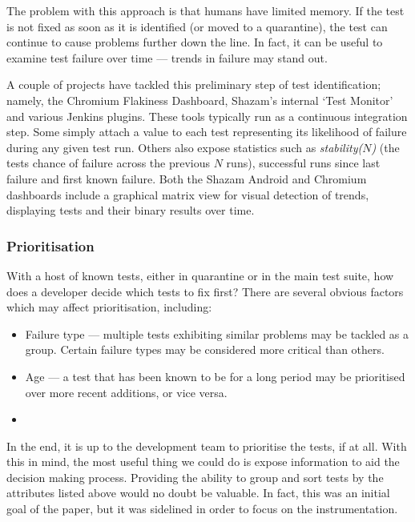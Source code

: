 The problem with this approach is that humans have limited memory. If the \flaky test is not fixed as soon as it is identified (or moved to a quarantine), the test can continue to cause problems further down the line. In fact, it can be useful to examine test failure over time --- trends in failure may stand out.

A couple of projects have tackled this preliminary step of \flaky test identification; namely, the Chromium Flakiness Dashboard\cite{flakinessDashboard}, Shazam’s internal {\lq}\flaky Test Monitor{\rq} and various Jenkins plugins. These tools typically run as a continuous integration step. Some simply attach a value to each test representing its likelihood of failure during any given test run. Others also expose statistics such as \emph{stability($N$)} (the tests chance of failure across the previous $N$ runs), successful runs since last failure and first known failure. Both the Shazam Android and Chromium dashboards include a graphical matrix view for visual detection of trends, displaying tests and their binary results over time.

\subsubsection{Prioritisation}

With a host of known \flaky tests, either in quarantine or in the main test suite, how does a developer decide which tests to fix first? There are several obvious factors which may affect prioritisation, including:
\begin{itemize}
	\item Failure type --- multiple \flaky tests exhibiting similar problems may be tackled as a group. Certain failure types may be considered more critical than others.
	\item Age --- a \flaky test that has been known to be \flaky for a long period may be prioritised over more recent additions, or vice versa.
	\item {}
\end{itemize}

In the end, it is up to the development team to prioritise the \flaky tests, if at all. With this in mind, the most useful thing we could do is expose information to aid the decision making process. Providing the ability to group and sort \flaky tests by the attributes listed above would no doubt be valuable. In fact, this was an initial goal of the paper, but it was sidelined in order to focus on the instrumentation.

